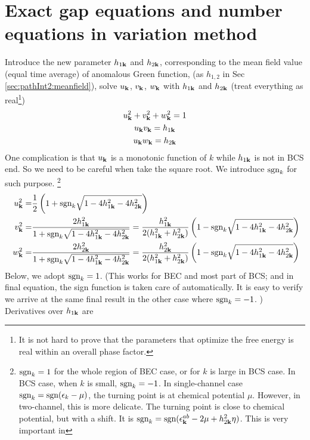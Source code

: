  \section{Exact gap equations and number equations in variation method}
Introduce the new parameter $h_{1\mathbf{k}}$ and $h_{2\mathbf{k}}$, corresponding to the mean field value (equal time average) of anomalous Green function,  (as $h_{1,2}$  in Sec \ref{sec:pathInt2:meanfield}), solve $u_{\mathbf{k}}$, $v_{\mathbf{k}}$, $w_{\mathbf{k}}$ with $h_{1\mathbf{k}}$ and $h_{2\mathbf{k}}$ (treat everything as real\footnote{It is not hard to prove that the parameters that optimize the free energy is real within an overall phase factor. })
\begin{gather}
u_{\mathbf{k}}^2+v^{2}_{\mathbf{k}}+w^{2}_{\mathbf{k}}=1\\
u_{\mathbf{k}}v_{\mathbf{k}}=h_{1\mathbf{k}}\\
u_{\mathbf{k}}w_{\mathbf{k}}=h_{2\mathbf{k}}
\end{gather}
One complication is that $u_{\mathbf{k}}$ is a monotonic function of $k$ while $h_{1\mathbf{k}}$ is not in BCS end.  So we need to be careful when take the square root.  We introduce $\text{sgn}_k$ for such purpose.  \footnote{\label{foot:20100909:sgn} $\text{sgn}_k=1$  for the whole region of BEC case, or for $k$ is large in BCS case. In BCS case, when $k$ is small, $\text{sgn}_{k}=-1$.  In single-channel case $\text{sgn}_{k}=\text{sgn}(\epsilon_{k}-\mu)$, the turning point is at chemical potential $\mu$.  However, in two-channel, this is more delicate.  The turning point is close to chemical potential, but with a shift. It is $\text{sgn}_k=\text{sgn}(\epsilon^{ab}_{\mathbf{k}}-2\mu+  h_{2\mathbf{k}}^2\eta)$.  This is very important in }
\begin{equation}
\begin{split}
u_{\mathbf{k}}^2=&\frac{1}{2} \left(1+\text{sgn}_{k}\sqrt{1-4 h_{1\mathbf{k}}^2-4 h_{2\mathbf{k}}^2}\right)\\
v^{2}_{\mathbf{k}}=&\frac{2 h_{1\mathbf{k}}^2}{1+\text{sgn}_{k}\sqrt{1-4 h_{1\mathbf{k}}^2-4 h_{2\mathbf{k}}^2}}
=\frac{ h_{1\mathbf{k}}^2}{2( h_{1\mathbf{k}}^2+ h_{2\mathbf{k}}^2)} \left(1-\text{sgn}_{k}\sqrt{1-4 h_{1\mathbf{k}}^2-4 h_{2\mathbf{k}}^2}\right)\\\
w^{2}_{\mathbf{k}}=&\frac{2 h_{2\mathbf{k}}^2}{1+\text{sgn}_{k}\sqrt{1-4 h_{1\mathbf{k}}^2-4 h_{2\mathbf{k}}^2}}
=\frac{h_{2\mathbf{k}}^2}{2( h_{1\mathbf{k}}^2+ h_{2\mathbf{k}}^2)} \left(1-\text{sgn}_{k}\sqrt{1-4 h_{1\mathbf{k}}^2-4 h_{2\mathbf{k}}^2}\right)
\end{split}
\end{equation}
Below, we adopt $\text{sgn}_k=1$. (This works for BEC and most part of BCS; and in final equation, the sign function is taken care of automatically.  It is easy to verify we arrive at the same final result in the other case where $\text{sgn}_{k}=-1$. ) Derivatives over $h_{1\mathbf{k}}$ are
